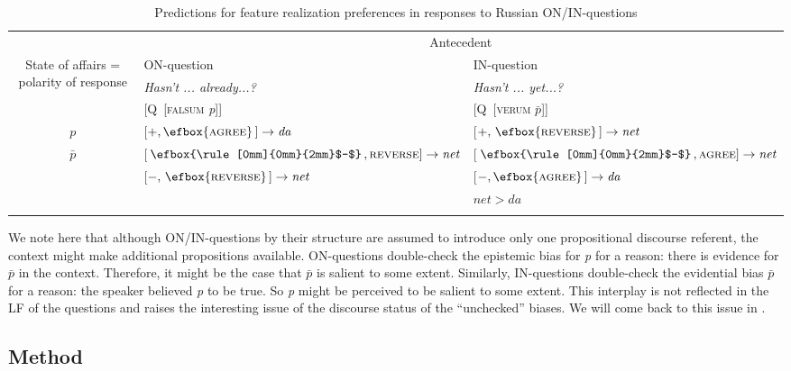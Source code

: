 \documentclass[output=paper,colorlinks,citecolor=brown]{langscibook}
\begin{document}
\begin{table}
\caption{Predictions for feature realization preferences in responses to Russian ON/IN-questions}
\label{geist-repp:tab:Predictions-for-feature-realization-preferences-RU-ON/IN-questions}
 \begin{tabular}{cll} 
\lsptoprule
 & \multicolumn{2}{c}{Antecedent} \\\cmidrule(lr){2-3}
\multirow{3}{6em}{State of affairs = polarity of response}  &  ON-question   & IN-question\\
& \textit{Hasn’t ... already...?} & \textit{Hasn’t ... yet...?}\\
& [Q~[\textsc{falsum} \textit{p}]] & [Q~[\textsc{verum} $\bar{p}$]]\\\midrule
$p$ & [$+,\efbox{\textsc{agree}}\,]\rightarrow\textit{da}$ & [$+,\,\efbox{\textsc{reverse}}\,]\rightarrow\textit{net}$\\\addlinespace
$\bar{p}$ & [$\,\efbox{\rule[0mm]{0mm}{2mm}$-$}\,,\textsc{reverse}]\rightarrow\textit{net}$  & [$\,\efbox{\rule[0mm]{0mm}{2mm}$-$}\,,\textsc{agree}]\rightarrow\textit{net}$ \\
& [$-,\,\efbox{\textsc{reverse}}\,]\rightarrow\textit{net}$ & [$-,\efbox{\textsc{agree}}\,]\rightarrow\textit{da}$ \\
& & $net>da$\\
 \lspbottomrule
 \end{tabular}
\end{table}

We note here that although ON/IN-questions by their structure are assumed to introduce only one propositional discourse referent, the context might make additional propositions available. ON-questions double-check the epistemic bias for \textit{p} for a reason: there is evidence for $\bar{p}$ in the context. Therefore, it might be the case that $\bar{p}$ is salient to some extent. Similarly, IN-questions double-check the evidential bias $\bar{p}$ for a reason: the speaker believed \textit{p} to be true. So \textit{p} might be perceived to be salient to some extent. This interplay is not reflected in the LF of the questions and raises the interesting issue of the discourse status of the ``unchecked'' biases. We will come back to this issue in .

\subsection{Method}\label{geist-repp:sec:method}
\end{document}
